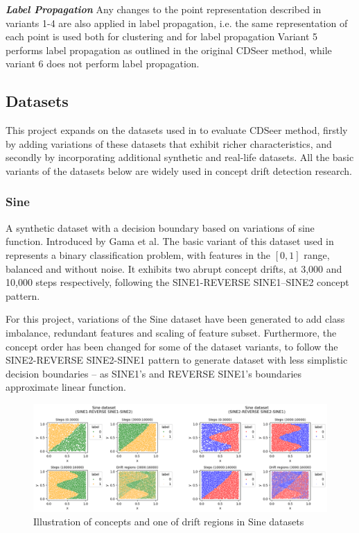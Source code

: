 \documentclass{svproc}
\begin{document}
\textbf{\textit{Label Propagation}} Any changes to the point representation described in variants 1-4 are also applied in label propagation, i.e. the same representation of each point is used both for clustering and for label propagation Variant 5 performs label propagation as outlined in the original CDSeer method, while variant 6 does not perform label propagation. 

\subsection{Datasets}

This project expands on the datasets used in \cite{pham2025} to evaluate CDSeer method, firstly by adding variations of these datasets that exhibit richer characteristics, and secondly by incorporating additional synthetic and real-life datasets. All the basic variants of the datasets below are widely used in concept drift detection research.

\subsubsection{Sine} A synthetic dataset with a decision boundary based on variations of sine function. Introduced by Gama et al. \cite{gama2004} The basic variant of this dataset used in \cite{pham2025} represents a binary classification problem, with features in the $[0,1]$ range, balanced and without noise. It exhibits two abrupt concept drifts, at 3,000 and 10,000 steps respectively, following the SINE1-REVERSE SINE1–SINE2 concept pattern. 

For this project, variations of the Sine dataset have been generated to add class imbalance, redundant features and scaling of feature subset. Furthermore, the concept order has been changed for some of the dataset variants, to follow the SINE2-REVERSE SINE2-SINE1 pattern to generate dataset with less simplistic decision boundaries – as SINE1’s and REVERSE SINE1’s boundaries approximate linear function.

\vspace{-10pt}
\begin{figure}
	\centering
	\includegraphics[scale=.6]{figures/Fig6_sine.png}
	\caption{Illustration of concepts and one of drift regions in Sine datasets}
	\label{fig:fig6}
\end{figure}
\vspace{-20pt}
\end{document}

